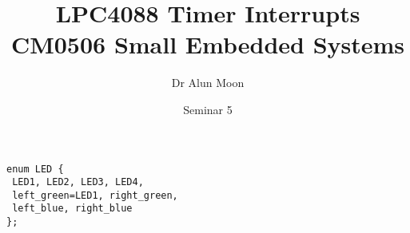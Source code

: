 \documentclass[a4paper]{tufte-handout}
\title{LPC4088 Timer Interrupts\\\small{CM0506 Small Embedded Systems}}
\author{Dr Alun Moon}
\date{Seminar 5}
\begin{document}
\maketitle

\begin{verbatim}
enum LED {
 LED1, LED2, LED3, LED4,
 left_green=LED1, right_green,
 left_blue, right_blue
};
\end{verbatim}




\clearpage
\appendix
\end{document}
